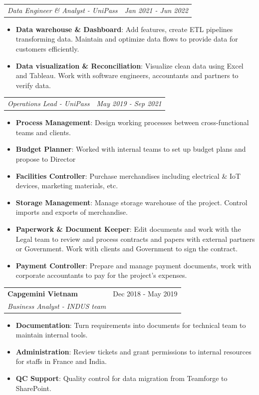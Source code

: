 \documentclass[letterpaper,11pt]{article}
\makeatletter
\newcommand{\resumeItem}[2]{
  \item\small{
    \textbf{#1}{: #2 \vspace{-2pt}}
  }
}
\newcommand{\resumeItemNornal}[1]{
  \item\small{
    {#1 \vspace{-2pt}}
  }
}
\newcommand{\resumeSubheading}[4]{
  \vspace{-1pt}
  \item
    \begin{tabular*}{0.97\textwidth}{l@{\extracolsep{\fill}}r}
      \textbf{#1} & #2 \\
      \textit{\small#3} & \textit{\small #4} \\
    \end{tabular*}\vspace{-5pt}
}
\newcommand{\resumeSubheadingNoTitle}[2]{
  \vspace{-1pt}
    \begin{tabular*}{0.97\textwidth}{l@{\extracolsep{\fill}}r}
      \textit{\small#1} & \textit{\small#2}
    \end{tabular*}\vspace{-5pt}
}
\newcommand{\resumeSubItemNormal}[1]{\resumeItemNornal{#1}\vspace{-4pt}}
\newcommand{\resumeItemListStart}{\begin{itemize}}
\newcommand{\resumeItemListEnd}{\end{itemize}\vspace{-5pt}}
\makeatother
\begin{document}
      \resumeSubheadingNoTitle
      {Data Engineer \& Analyst - UniPass}{Jan 2021 - Jun 2022}
      \resumeItemListStart
        \resumeItem{Data warehouse \& Dashboard}
        {Add features, create ETL pipelines transforming data. Maintain and optimize data flows to provide data for customers efficiently.}
        \resumeItem{Data visualization \& Reconciliation}
        {Visualize clean data using Excel and Tableau. Work with software engineers, accountants and partners to verify data.}
      \resumeItemListEnd
      \resumeSubheadingNoTitle
      {Operations Lead - UniPass}{May 2019 - Sep 2021}
      \resumeItemListStart
        \resumeItem{Process Management}{Design working processes between cross-functional teams and clients.}
        \resumeItem{Budget Planner}{Worked with internal teams to set up budget plans and propose to Director}
        \resumeItem{Facilities Controller}
        {Purchase merchandises including electrical \& IoT devices, marketing materials, etc.}
        \resumeItem{Storage Management}
        {Manage storage warehouse of the project. Control imports and exports of merchandise.}
        \resumeItem{Paperwork \& Document Keeper}
          {Edit documents and work with the Legal team to review and process contracts and papers with external partners or Government. Work with clients and Government to sign the contract.}
         \resumeItem{Payment Controller}
          {Prepare and manage payment documents, work with corporate accountants to pay for the project's expenses.}
      \resumeItemListEnd
      
    \resumeSubheading
      {Capgemini Vietnam}{Dec 2018 - May 2019}
      {Business Analyst - INDUS team}{}
      \resumeItemListStart
        \resumeItem{Documentation}
          {Turn requirements into documents for technical team to maintain internal tools.} 
        \resumeItem{Administration}
            {Review tickets and grant permissions to internal resources for staffs in France and India.}
        \resumeItem{QC Support}    
            {Quality control for data migration from Teamforge to SharePoint. }
      \resumeItemListEnd
\end{document}
